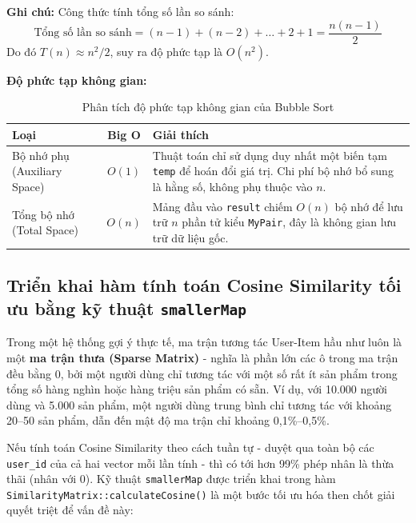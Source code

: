 \documentclass{report}
\begin{document}
\textbf{Ghi chú:} Công thức tính tổng số lần so sánh:
$$\text{Tổng số lần so sánh} = (n-1) + (n-2) + \dots + 2 + 1 = \frac{n(n-1)}{2}$$
Do đó $T(n) \approx n^2/2$, suy ra độ phức tạp là $O(n^2)$.

\textbf{Độ phức tạp không gian:}

\begin{table}[H]
    \centering
    \renewcommand{\arraystretch}{1.5}
    \begin{tabularx}{\textwidth}{|>{\centering\arraybackslash}p{3.5cm}|c|>{\raggedright\arraybackslash}X|}
        \hline
        \textbf{Loại} & \textbf{Big O} & \textbf{Giải thích} \\ \hline
        Bộ nhớ phụ (Auxiliary Space) & $O(1)$ & Thuật toán chỉ sử dụng duy nhất một biến tạm \texttt{temp} để hoán đổi giá trị. Chi phí bộ nhớ bổ sung là hằng số, không phụ thuộc vào $n$. \\ \hline
        Tổng bộ nhớ (Total Space) & $O(n)$ & Mảng đầu vào \texttt{result} chiếm $O(n)$ bộ nhớ để lưu trữ $n$ phần tử kiểu \texttt{MyPair}, đây là không gian lưu trữ dữ liệu gốc. \\ \hline
    \end{tabularx}
    \caption{Phân tích độ phức tạp không gian của Bubble Sort}
    \label{tab:space_bubble}
\end{table}

\subsection{Triển khai hàm tính toán Cosine Similarity tối ưu bằng kỹ thuật \texttt{smallerMap}}

Trong một hệ thống gợi ý thực tế, ma trận tương tác User-Item hầu như luôn là một \textbf{ma trận thưa (Sparse Matrix)} - nghĩa là phần lớn các ô trong ma trận đều bằng 0, bởi một người dùng chỉ tương tác với một số rất ít sản phẩm trong tổng số hàng nghìn hoặc hàng triệu sản phẩm có sẵn. Ví dụ, với 10.000 người dùng và 5.000 sản phẩm, một người dùng trung bình chỉ tương tác với khoảng 20--50 sản phẩm, dẫn đến mật độ ma trận chỉ khoảng 0,1\%--0,5\%.

Nếu tính toán Cosine Similarity theo cách tuần tự - duyệt qua toàn bộ các \texttt{user\_id} của cả hai vector mỗi lần tính - thì có tới hơn 99\% phép nhân là thừa thãi (nhân với 0). Kỹ thuật \texttt{smallerMap} được triển khai trong hàm \texttt{SimilarityMatrix::calculateCosine()} là một bước tối ưu hóa then chốt giải quyết triệt để vấn đề này:
\end{document}
